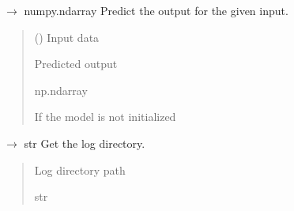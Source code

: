 \documentclass[letterpaper,10pt,english]{sphinxmanual}
\begin{document}

\begin{fulllineitems}
\label{\detokenize{autoapi/src/LSTMTrainer/index:src.LSTMTrainer.predict}}
\pysigstartsignatures
\pysiglinewithargsret
{}
{}
{{ $\rightarrow$ numpy.ndarray}}
\pysigstopsignatures
\sphinxAtStartPar
Predict the output for the given input.
\begin{quote}\begin{description}
\sphinxAtStartPar
{} () \textendash{} Input data

\sphinxAtStartPar
Predicted output

\sphinxAtStartPar
np.ndarray

\sphinxAtStartPar
{} \textendash{} If the model is not initialized

\end{description}\end{quote}

\end{fulllineitems}


\begin{fulllineitems}
\label{\detokenize{autoapi/src/LSTMTrainer/index:src.LSTMTrainer.get_log_dir}}
\pysigstartsignatures
\pysiglinewithargsret
{}
{}
{{ $\rightarrow$ str}}
\pysigstopsignatures
\sphinxAtStartPar
Get the log directory.
\begin{quote}\begin{description}
\sphinxAtStartPar
Log directory path

\sphinxAtStartPar
str

\end{description}\end{quote}

\end{fulllineitems}
\end{document}
